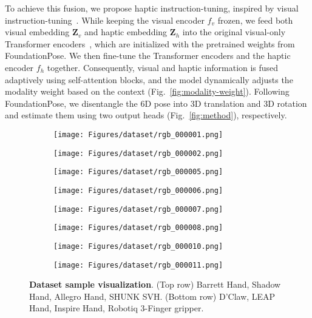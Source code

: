 \documentclass[11pt, a4paper, logo, twocolumn]{brown}
\begin{document}
To achieve this fusion, we propose haptic instruction-tuning, inspired by visual instruction-tuning~\cite{liu_visual_2023}.
While keeping the visual encoder $f_v$ frozen, we feed both visual embedding $\mathbf{Z}_v$ and haptic embedding $\mathbf{Z}_h$ into the original visual-only Transformer encoders~\cite{vaswani_attention_2017, wen_foundationpose_2024}, which are initialized with the pretrained weights from FoundationPose.
We then fine-tune the Transformer encoders and the haptic encoder $f_h$ together.
Consequently, visual and haptic information is fused adaptively using self-attention blocks, and the model dynamically adjusts the modality weight based on the context (Fig.~\ref{fig:modality-weight}).
Following FoundationPose, we disentangle the 6D pose into 3D translation and 3D rotation and estimate them using two output heads (Fig.~\ref{fig:method}), respectively. 

\begin{figure*}[t!]
    \centering
    \begin{subfigure}[b]{0.2455\textwidth}
        \centering
        \texttt{[image: Figures/dataset/rgb\_000001.png]}
    \end{subfigure}
    \hfill
    \begin{subfigure}[b]{0.2455\textwidth}
        \centering
        \texttt{[image: Figures/dataset/rgb\_000002.png]}
    \end{subfigure}
    \hfill
    \begin{subfigure}[b]{0.2455\textwidth}
        \centering
        \texttt{[image: Figures/dataset/rgb\_000005.png]}
    \end{subfigure}
    \hfill
    \begin{subfigure}[b]{0.2455\textwidth}
        \centering
        \texttt{[image: Figures/dataset/rgb\_000006.png]}
    \end{subfigure}

    \begin{subfigure}[b]{0.2455\textwidth}
        \centering
        \texttt{[image: Figures/dataset/rgb\_000007.png]}
    \end{subfigure}
    \hfill
    \begin{subfigure}[b]{0.2455\textwidth}
        \centering
        \texttt{[image: Figures/dataset/rgb\_000008.png]}
    \end{subfigure}
    \hfill
    \begin{subfigure}[b]{0.2455\textwidth}
        \centering
        \texttt{[image: Figures/dataset/rgb\_000010.png]}
    \end{subfigure}
    \hfill
    \begin{subfigure}[b]{0.2455\textwidth}
        \centering
        \texttt{[image: Figures/dataset/rgb\_000011.png]}
    \end{subfigure}
    \caption{
    \textbf{Dataset sample visualization}.
    (Top row) Barrett Hand, Shadow Hand, Allegro Hand, SHUNK SVH.
    (Bottom row) D'Claw, LEAP Hand, Inspire Hand, Robotiq 3-Finger gripper.
    }
    \label{fig:dataset-visualization}
\end{figure*}
\end{document}
